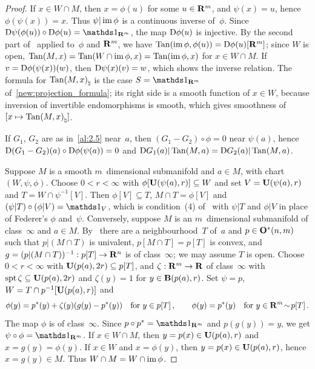 \begin{proof}
    If $x \in W \cap M$, then $x = \phi(u)$ for some $u \in \mathbf{R}^m$, and $\psi(x) = u$, hence
    $\phi(\psi(x)) = x$. Thus $\psi | \operatorname{im} \phi$ is a continuous inverse of~$\phi$. Since $\uD
    \psi(\phi(u)) \circ \uD \phi(u) = \id{\R^m}$, the map $\mathrm{D} \phi(u)$ is injective. By the
    second part of~\cite[3.1.21]{Federer1969} applied to~$\phi$ and $\mathbf{R}^m$, we have $\operatorname{Tan}(\operatorname{im}
    \phi, \phi(u)) = \mathrm{D} \phi(u)[\mathbf{R}^m]$; since $W$ is open, $\operatorname{Tan}(M,x) = \operatorname{Tan}(W \cap \operatorname{im} \phi, x)
    = \operatorname{Tan}(\operatorname{im} \phi, x)$ for $x \in W \cap M$. If $v = \mathrm{D} \phi(\psi(x))(w)$, then $\mathrm{D}
    \psi(x)(v) = w$, which shows the inverse relation. The formula for ${\operatorname{Tan}(M,x)}_\natural$ is
    the case $S = \id{\R^m}$ of~\ref{new:projection_formula}; its right side is a smooth function
    of $x \in W$, because inversion of invertible endomorphisms is smooth, which gives
    smoothness of $[x \mapsto {\operatorname{Tan}(M,x)}_\natural]$.

    If $G_1$, $G_2$ are as in~\ref{al:2.5} near~$a$, then $(G_1 - G_2) \circ \phi = 0$ near
    $\psi(a)$, hence $\mathrm{D} (G_1 - G_2)(a) \circ \mathrm{D} \phi(\psi(a)) = 0$ and $\mathrm{D} G_1(a) |
    \operatorname{Tan}(M,a) = \mathrm{D} G_2(a) | \operatorname{Tan}(M,a)$.

    Suppose $M$ is a smooth $m$~dimensional submanifold and $a \in M$, with chart
    $(W,\psi,\phi)$. Choose $0 < r < \infty$ with $\phi[\mathbf{U}(\psi(a),r)] \subseteq W$ and set
    $V = \mathbf{U}(\psi(a),r)$ and $T = W \cap \psi^{-1}[V]$. Then $\phi[V] \subseteq T$, $M \cap
    T = \phi[V]$ and $(\psi|T) \circ (\phi | V) = \id{V}$, which is condition~(4)
    of~\cite[3.1.19]{Federer1969} with $\psi|T$ and $\phi|V$ in place of Federer's $\phi$
    and~$\psi$. Conversely, suppose $M$ is an $m$~dimensional submanifold of class~$\infty$ and
    $a \in M$. By~\cite[3.1.19(5)]{Federer1969} there are a neighbourhood~$T$ of~$a$ and $p \in
    \mathbf{O}^\ast({n},{m})$ such that $p | (M \cap T)$ is univalent, $p[M \cap T] = p[T]$ is
    convex, and $g = (p | (M \cap T))^{-1} : p[T] \to \mathbf{R}^{n}$ is of class~$\infty$; we may
    assume $T$ is open. Choose $0 < r < \infty$ with $\mathbf{U}(p(a),2r) \subseteq p[T]$, and
    $\zeta : \mathbf{R}^m \to \mathbf{R}$ of class~$\infty$ with $\operatorname{spt} \zeta \subseteq \mathbf{U}(p(a),2r)$ and
    $\zeta(y) = 1$ for $y \in \mathbf{B}(p(a),r)$. Set $\psi = p$, $W = T \cap p^{-1}[\mathbf{U}(p(a),r)]$
    and
    \begin{displaymath}
        \phi(y) = p^{*}(y) + \zeta(y) (g(y) - p^{*}(y)) \quad \text{for $y \in
        p[T]$} \,, \qquad \phi(y) = p^{*}(y) \quad \text{for $y \in \mathbf{R}^m \!\sim\! p[T]$}
        \,.
    \end{displaymath}
    The map $\phi$ is of class~$\infty$. Since $p \circ \transpose{p} = \id{\R^m}$ and $p(g(y))
    = y$, we get $\psi \circ \phi = \id{\R^m}$. If $x \in W \cap M$, then $y = p(x) \in
    \mathbf{U}(p(a),r)$ and $x = g(y) = \phi(y)$. If $x \in W$ and $x = \phi(y)$, then $y = p(x) \in
    \mathbf{U}(p(a),r)$, hence $x = g(y) \in M$. Thus $W \cap M = W \cap \operatorname{im} \phi$.
\end{proof}

